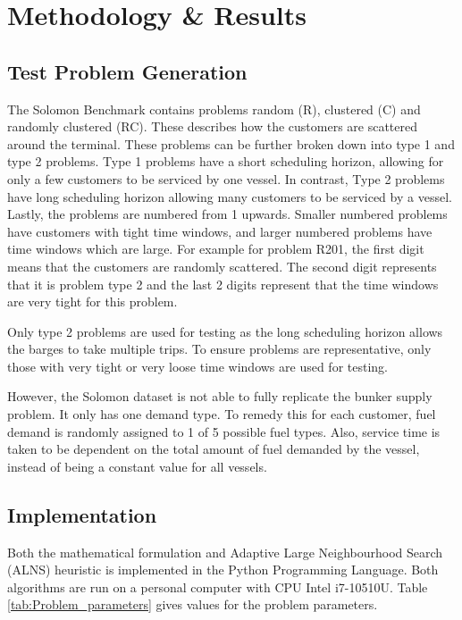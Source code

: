 \chapter{Methodology \& Results}

\section{Test Problem Generation} \label{Test_Problem}
The Solomon Benchmark \cite{solomon_algorithms_1987} contains problems random (R), clustered (C) and randomly clustered (RC). These describes how the customers are scattered around the terminal. These problems can be further broken down into type 1 and type 2 problems. Type 1 problems have a short scheduling horizon, allowing for only a few customers to be serviced by one vessel. In contrast, Type 2 problems have long scheduling horizon allowing many customers to be serviced by a vessel. Lastly, the problems are numbered from 1 upwards. Smaller numbered problems have customers with tight time windows, and larger numbered problems have time windows which are large. For example for problem R201, the first digit means that the customers are randomly scattered. The second digit represents that it is problem type 2 and the last 2 digits represent that the time windows are very tight for this problem.

Only type 2 problems are used for testing as the long scheduling horizon allows the barges to take multiple trips. To ensure problems are representative, only those with very tight or very loose time windows are used for testing.

However, the Solomon dataset is not able to fully replicate the bunker supply problem. It only has one demand type. To remedy this for each customer, fuel demand is randomly assigned to 1 of 5 possible fuel types. Also, service time is taken to be dependent on the total amount of fuel demanded by the vessel, instead of being a constant value for all vessels.

\section{Implementation}
Both the mathematical formulation and Adaptive Large Neighbourhood Search (ALNS) heuristic is implemented in the Python Programming Language. Both algorithms are run on a personal computer with CPU Intel i7-10510U.
Table \ref{tab:Problem_parameters} gives values for the problem parameters.\\

